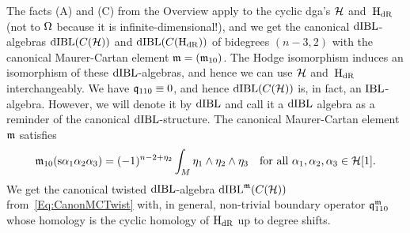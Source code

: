 \documentclass[\MainFolder/Text.tex]{subfiles}
\begin{document}
The facts (A) and (C) from the Overview apply to the cyclic dga's $\mathcal{H}{}$ and~$\mathrm{H}_{\mathrm{dR}}{}$ (not to $\Omega{}$ because it is infinite-dimensional!), and we get the canonical $\mathrm{dIBL}$-algebras $\mathrm{dIBL}(C(\mathcal{H}))$ and $\mathrm{dIBL}(C(\mathrm{H}_{\mathrm{dR}}))$ of bidegrees $(n-3,2)$ with the canonical Maurer-Cartan element $\mathfrak{m} = (\mathfrak{m}_{10})$. The Hodge isomorphism induces an isomorphism of these $\mathrm{dIBL}$-algebras, and hence we can use $\mathcal{H}$ and~$\mathrm{H}_{\mathrm{dR}}$ interchangeably.
We have $\mathfrak{q}_{110} \equiv 0$, and hence $\mathrm{dIBL}(C(\mathcal{H}))$ is, in fact, an $\mathrm{IBL}$-algebra. However, we will denote it by $\mathrm{dIBL}$ and call it a $\mathrm{dIBL}$ algebra as a reminder of the canonical $\mathrm{dIBL}$-structure. The canonical Maurer-Cartan element~$\mathfrak{m}$ satisfies
\begin{equation}\label{Eq:CanonMC}
\mathfrak{m}_{10}(\mathrm{s} \alpha_1 \alpha_2 \alpha_3) = (-1)^{n-2 + \eta_2} \int_M \eta_1 \wedge \eta_2 \wedge \eta_3 \quad \text{for all } \alpha_1, \alpha_2, \alpha_3 \in \mathcal{H}[1].
\end{equation}
We get the canonical twisted $\mathrm{dIBL}$-algebra $\mathrm{dIBL}^{\mathfrak{m}}(C(\mathcal{H}))$ from~\eqref{Eq:CanonMCTwist} with, in general, non-trivial boundary operator $\mathfrak{q}_{110}^{\mathfrak{m}}$ whose homology is the cyclic homology of $\mathrm{H}_{\mathrm{dR}}$ up to degree shifts.
%
\end{document}
